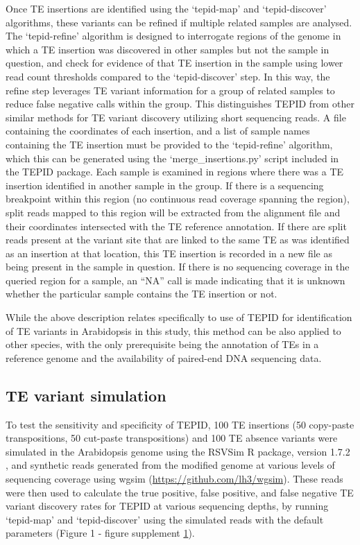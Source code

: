 \documentclass[12pt]{article}
\begin{document}
Once TE insertions are identified using the `tepid-map' and
`tepid-discover' algorithms, these variants can be refined if multiple
related samples are analysed. The `tepid-refine' algorithm is designed
to interrogate regions of the genome in which a TE insertion was
discovered in other samples but not the sample in question, and check
for evidence of that TE insertion in the sample using lower read count
thresholds compared to the `tepid-discover' step. In this way, the
refine step leverages TE variant information for a group of related
samples to reduce false negative calls within the group. This
distinguishes TEPID from other similar methods for TE variant discovery
utilizing short sequencing reads. A file containing the coordinates of
each insertion, and a list of sample names containing the TE insertion
must be provided to the `tepid-refine' algorithm, which this can be
generated using the `merge\_insertions.py' script included in the TEPID
package. Each sample is examined in regions where there was a TE
insertion identified in another sample in the group. If there is a
sequencing breakpoint within this region (no continuous read coverage
spanning the region), split reads mapped to this region will be
extracted from the alignment file and their coordinates intersected with
the TE reference annotation. If there are split reads present at the
variant site that are linked to the same TE as was identified as an
insertion at that location, this TE insertion is recorded in a new file
as being present in the sample in question. If there is no sequencing
coverage in the queried region for a sample, an ``NA'' call is made
indicating that it is unknown whether the particular sample contains the
TE insertion or not.

While the above description relates specifically to use of TEPID for
identification of TE variants in Arabidopsis in this study, this method
can be also applied to other species, with the only prerequisite being
the annotation of TEs in a reference genome and the availability of
paired-end DNA sequencing data.

\subsection{TE variant simulation}

To test the sensitivity and specificity of TEPID, 100 TE insertions
(50 copy-paste transpositions, 50 cut-paste transpositions) and 100 TE
absence variants were simulated in the Arabidopsis genome using the
RSVSim R package, version 1.7.2 \cite{Bartenhagen:2013kl}, and
synthetic reads generated from the modified genome at various levels
of sequencing coverage using wgsim \cite{Li:2009ka}
(\url{https://github.com/lh3/wgsim}).  These reads were then used to
calculate the true positive, false positive, and false negative TE
variant discovery rates for TEPID at various sequencing depths, by
running `tepid-map' and `tepid-discover' using the simulated reads
with the default parameters (Figure 1 - figure supplement
\hyperref[fig1s1]{1}).
\end{document}
